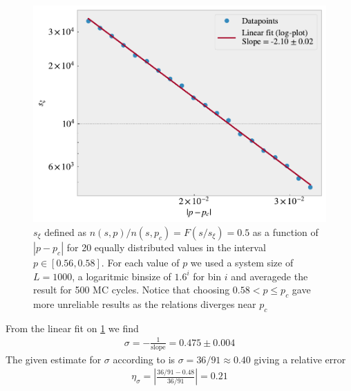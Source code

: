 \documentclass[reprint, amsmath, amssymb, aps]{revtex4-2}
\begin{document}
\begin{figure}[H]
  \includegraphics[width=\linewidth]{figures/h_sigma.pdf}
  \caption{$s_{\xi}$ defined as $n(s,p)/n(s,p_c) = F(s/s_{\xi}) = 0.5$ as a function of $|p-p_c|$ for 20 equally distributed values in the interval $p \in [0.56, 0.58]$. For each value of $p$ we used a system size of $L = 1000$, a logaritmic binsize of $1.6^i$ for bin $i$ and averagede the result for 500 MC cycles. Notice that choosing $0.58 < p \le p_c$ gave more unreliable results as the relations diverges near $p_c$}
  \label{fig:h}
\end{figure}
From the linear fit on \ref{fig:h} we find
\begin{align*}
  \sigma = -\frac{1}{\text{slope}} =  0.475 \pm 0.004
\end{align*}
The given estimate for $\sigma$ according to \cite{textbook} is $\sigma = 36/91 \approx 0.40$ giving a relative error
\begin{align*}
  \eta_\sigma = \left|\frac{36/91 - 0.48}{36/91}\right| = 0.21
\end{align*}
%
%
\end{document}
